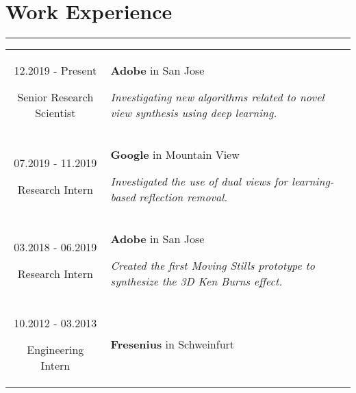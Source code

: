 \documentclass[10pt]{article}
\begin{document}
\section*{Work Experience}
\vspace{-0.3cm}
{\color{E6E6E6} \hrule height 0.04cm}
\vspace{0.4cm}
\renewcommand{\arraystretch}{1.0}
\begin{tabular}{C Z D}
	{
		12.2019 - Present
		
		\vspace{-0.05cm}
		
		{\scriptsize Senior Research Scientist}
	}
	&
	{	
		{\bf Adobe} {\scriptsize in San Jose}
		
		\vspace{0.05cm}
		
		{\scriptsize \it Investigating new algorithms related to novel view synthesis using deep learning.}
		
		\vspace{0.0cm}
	}
	\\
	{
		07.2019 - 11.2019
		
		\vspace{-0.05cm}
		
		{\scriptsize Research Intern}
	}
	&
	{	
		{\bf Google} {\scriptsize in Mountain View}
		
		\vspace{0.05cm}
		
		{\scriptsize \it Investigated the use of dual views for learning-based reflection removal.}
		
		\vspace{0.0cm}
	}
	\\
	{
		03.2018 - 06.2019
		
		\vspace{-0.05cm}
		
		{\scriptsize Research Intern}
	}
	&
	{	
		{\bf Adobe} {\scriptsize in San Jose}
		
		\vspace{0.05cm}
		
		{\scriptsize \it Created the first Moving Stills prototype to synthesize the 3D Ken Burns effect.}
		
		\vspace{0.0cm}
	}
	\\
	{
		10.2012 - 03.2013
		
		\vspace{-0.05cm}
		
		{\scriptsize Engineering Intern}
	}
	&
	{	
		{\bf Fresenius} {\scriptsize in Schweinfurt}
		
}
\end{tabular}
\end{document}
